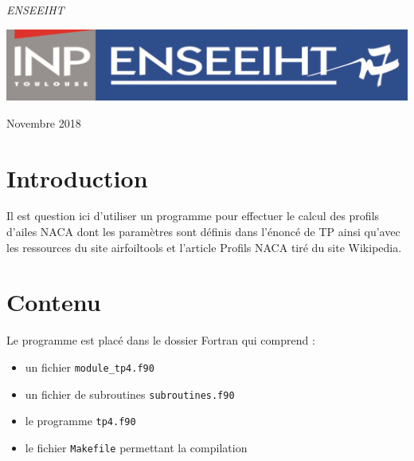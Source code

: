 \documentclass[a4paper,oneside]{article}
\begin{document}
\begin{titlepage}
	\textit{ENSEEIHT} %

	\vfill %


	\includegraphics[scale=0.3]{logoN7.png} %

	\vspace{0.3\baselineskip} %

Novembre 2018 %

	

\end{titlepage}
\newpage


\section{Introduction}
Il est question ici d'utiliser un programme pour effectuer le calcul des profils d'ailes NACA dont les paramètres sont définis dans l'énoncé de TP ainsi qu'avec les ressources du site airfoiltools et l'article Profils NACA tiré du site Wikipedia.

\section{Contenu}

Le programme est placé dans le dossier Fortran qui comprend :

\begin{itemize}
	\item un fichier \verb?module_tp4.f90? %
	\item un fichier de subroutines \verb?subroutines.f90?
	\item le programme \verb?tp4.f90?
	\item le fichier \verb?Makefile? permettant la compilation\\
	\end{itemize}
\end{document}
